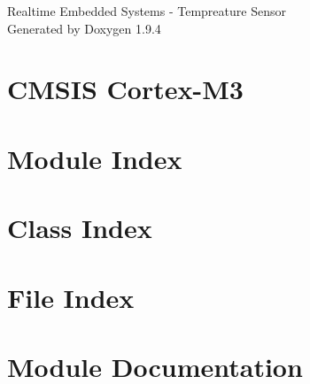 \documentclass[twoside]{book}
\newcommand{\+}{\discretionary{\mbox{\scriptsize$\hookleftarrow$}}{}{}}
\newcommand{\clearemptydoublepage}{%
    \newpage{\pagestyle{empty}\cleardoublepage}%
  }
\begin{document}
  \raggedbottom
    \hypersetup{pageanchor=false,
                bookmarksnumbered=true,
                pdfencoding=unicode
               }
  \begin{titlepage}
  \vspace*{7cm}
  \begin{center}%
  {\Large Realtime Embedded Systems -\/ Tempreature Sensor}\\
  \vspace*{1cm}
  {\large Generated by Doxygen 1.9.4}\\
  \end{center}
  \end{titlepage}
  \clearemptydoublepage
  \tableofcontents
  \clearemptydoublepage
  \hypersetup{pageanchor=true}
\chapter{CMSIS Cortex-\/\+M3}
\label{index}\hypertarget{index}{}
\chapter{Module Index}

\chapter{Class Index}

\chapter{File Index}

\chapter{Module Documentation}














\end{document}
